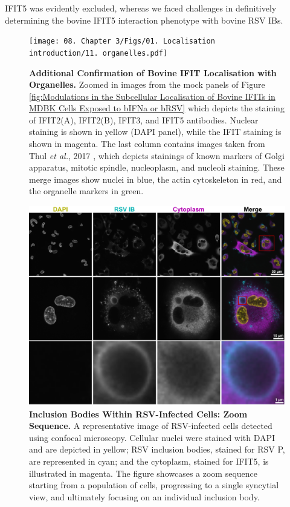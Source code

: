 IFIT5 was evidently excluded, whereas we faced challenges in definitively determining the bovine IFIT5 interaction phenotype with bovine RSV IBs.

\begin{figure}
    \centering
    \texttt{[image: 08. Chapter 3/Figs/01. Localisation introduction/11. organelles.pdf]}
    \caption[Additional Confirmation of Bovine IFIT Localisation with Organelles.]{\textbf{Additional Confirmation of Bovine IFIT Localisation with Organelles.} Zoomed in images from the mock panels of Figure \ref{fig:Modulations in the Subcellular Localisation of Bovine IFITs in MDBK Cells Exposed to bIFNa or bRSV} which depicts the staining of IFIT2(A), IFIT2(B), IFIT3, and IFIT5 antibodies. Nuclear staining is shown in yellow (DAPI panel), while the IFIT staining is shown in magenta. The last column contains images taken from Thul \textit{et al.}, 2017 \cite{Thul2017AProteome}, which depicts stainings of known markers of Golgi apparatus, mitotic spindle, nucleoplasm, and nucleoli staining. These merge images show nuclei in blue, the actin cytoskeleton in red, and the organelle markers in green.}
    \label{fig:Additional Confirmation of IFIT Localisation with Organelles}
\end{figure}

\begin{figure}
    \centering
    \includegraphics[width=1\linewidth]{08. Chapter 3/Figs/01. Localisation introduction/01. IB-zooms.pdf}
    \caption[Inclusion Bodies Within RSV-Infected Cells: Zoom Sequence.]{\textbf{Inclusion Bodies Within RSV-Infected Cells: Zoom Sequence.} A representative image of RSV-infected cells detected using confocal microscopy. Cellular nuclei were stained with DAPI and are depicted in yellow; RSV inclusion bodies, stained for RSV P, are represented in cyan; and the cytoplasm, stained for IFIT5, is illustrated in magenta. The figure showcases a zoom sequence starting from a population of cells, progressing to a single syncytial view, and ultimately focusing on an individual inclusion body.}
    \label{fig:Inclusion Bodies Within RSV Infected Cells: Zoom Sequence}
\end{figure}


